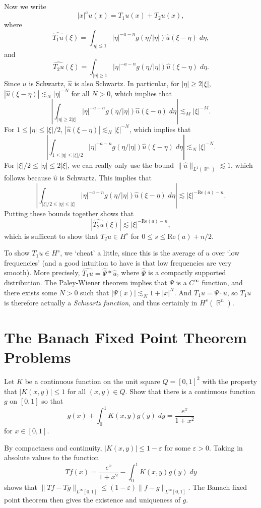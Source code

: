 \documentclass[answers]{exam}
\DeclareMathOperator{\RR}{\mathbb{R}}
\begin{document}
\begin{questions}
\begin{solution}
    Now we write
    \[ |x|^a u(x) = T_1 u(x) + T_2 u(x), \]
    where
    \[ \widehat{T_1 u}(\xi) = \int_{|\eta| \leq 1} |\eta|^{-a-n} g(\eta/|\eta|) \widehat{u}(\xi - \eta)\; d\eta, \]
    and
    \[ \widehat{T_2 u}(\xi) = \int_{|\eta| \geq 1} |\eta|^{-a-n} g(\eta/|\eta|) \widehat{u}(\xi - \eta)\; d\eta. \]
    Since $u$ is Schwartz, $\widehat{u}$ is also Schwartz. In particular, for $|\eta| \geq 2|\xi|$, $|\widehat{u}(\xi - \eta)| \lesssim_N |\eta|^{-N}$ for all $N > 0$, which implies that
    \[ \left| \int_{|\eta| \geq 2|\xi|} |\eta|^{-a-n} g(\eta/|\eta|) \widehat{u}(\xi - \eta)\; d\eta \right| \lesssim_M |\xi|^{-M}. \]
    For $1 \leq |\eta| \leq |\xi|/2$, $|\widehat{u}(\xi - \eta)| \lesssim_N |\xi|^{-N}$, which implies that
    \[ \left| \int_{1 \leq |\eta| \leq |\xi|/2} |\eta|^{-a-n} g(\eta/|\eta|) \widehat{u}(\xi - \eta)\; d\eta \right| \lesssim_N |\xi|^{-N}. \]
    For $|\xi|/2 \leq |\eta| \leq 2|\xi|$, we can really only use the bound $\| \widehat{u} \|_{L^1(\RR^n)} \lesssim 1$, which follows because $\widehat{u}$ is Schwartz. This implies that
    \[ \left| \int_{|\xi|/2 \leq |\eta| \leq |\xi|} |\eta|^{-a-n} g(\eta/|\eta|) \widehat{u}(\xi - \eta)\; d\eta \right| \lesssim |\xi|^{-\text{Re}(a) - n}. \]
    Putting these bounds together shows that
    \[ |\widehat{T_2 u}(\xi)| \lesssim |\xi|^{-\text{Re}(a)-n}, \]
    which is sufficent to show that $T_2 u \in H^s$ for $0 \leq s \leq \text{Re}(a) + n/2$.
    
    To show $T_1 u \in H^s$, we `cheat' a little, since this is the average of $u$ over `low frequencies' (and a good intuition to have is that low frequencies are very smooth). More precisely, $\widehat{T_1 u} = \widehat{\Psi} * \widehat{u}$, where $\widehat{\Psi}$ is a compactly supported distribution. The Paley-Wiener theorem implies that $\Psi$ is a $C^\infty$ function, and there exists some $N > 0$ such that $|\Psi(x)| \lesssim_N 1 + |x|^N$. And $T_1 u = \Psi \cdot u$, so $T_1 u$ is therefore actually a \emph{Schwartz function}, and thus certainly in $H^s(\RR^n)$.
\end{solution}

\newpage
\section{The Banach Fixed Point Theorem Problems}

\question Let $K$ be a continuous function on the unit square $Q = [0,1]^2$ with the property that $|K(x,y)| \leq 1$ for all $(x,y) \in Q$. Show that there is a continuous function $g$ on $[0,1]$ so that
%
\[ g(x) + \int_0^1 K(x,y) g(y)\; dy = \frac{e^x}{1 + x^2} \]
%
for $x \in [0,1]$.
\begin{solution}
	By compactness and continuity, $|K(x,y)| \leq 1 - \varepsilon$ for some $\varepsilon > 0$. Taking in absolute values to the function
	\[ Tf(x) = \frac{e^x}{1 + x^2} - \int_0^1 K(x,y) g(y)\; dy \]
	shows that $\| Tf - Tg \|_{L^\infty[0,1]} \leq (1 - \varepsilon) \| f - g \|_{L^\infty[0,1]}$. The Banach fixed point theorem then gives the existence and uniqueness of $g$.
\end{solution}


\end{questions}
\end{document}
